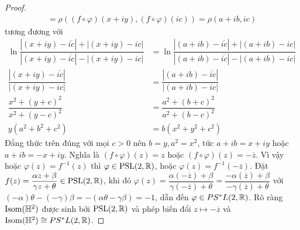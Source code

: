 \begin{proof}
\begin{align*}
        = \rho((f\circ \varphi)(x+iy),(f\circ \varphi)(ic))
        = \rho(a+ib,ic)
    \end{align*}
    tương đương với 
    \begin{align*}
        \ln{\dfrac{|(x+iy)-\overline{ic}|+|(x+iy)-ic|}{|(x+iy)-\overline{ic}|-|(x+iy)-ic|}} &= \ln{\dfrac{|(a+ib)-\overline{ic}|+|(a+ib)-ic|}{|(a+ib)-\overline{ic}|-|(a+ib)-ic|}}\\
        \dfrac{|(x+iy)-\overline{ic}|}{|(x+iy)-ic|} &= \dfrac{|(a+ib)-\overline{ic}|}{|(a+ib)-ic|}\\
        \dfrac{x^2+(y+c)^2}{x^2+(y-c)^2} &= \dfrac{a^2+(b+c)^2}{a^2+(b-c)^2}\\
        y(a^2 + b^2 + c^2) &= b(x^2+y^2+c^2)
    \end{align*}
    Đẳng thức trên đúng với mọi $c>0$ nên $b=y, a^2 = x^2$, tức $a+ib = x+iy$ hoặc $a+ib = -x+iy$. Nghĩa là $(f\circ \varphi)(z) = z$ hoặc $(f\circ \varphi)(z) = -\overline{z}$. Vì vậy hoặc $\varphi(z) = f^{-1}(z)$ thì $\varphi \in \operatorname{PSL}(2,\mathbb{R})$, hoặc $\varphi(z) = f^{-1}(-\overline{z})$. Đặt $f(z) = \dfrac{\alpha z+\beta}{\gamma z+ \theta} \in \operatorname{PSL}(2,\mathbb{R})$, khi đó $\varphi(z) = \dfrac{\alpha (-\overline{z})+\beta}{\gamma (-\overline{z})+ \theta} = \dfrac{-\alpha (\overline{z})+\beta}{-\gamma (\overline{z})+ \theta}$ với $(-\alpha) \theta - (-\gamma)\beta = -(\alpha \theta - \gamma \beta) = -1$, dẫn đến $\varphi \in PS^*L(2,\mathbb{R})$. Rõ ràng $\operatorname{Isom}(\mathbb{H}^2)$ được sinh bởi $\operatorname{PSL}(2,\mathbb{R})$ và phép biến đổi $z\mapsto -\overline{z}$ và $\operatorname{Isom}(\mathbb{H}^2) \cong PS^*L(2,\mathbb{R})$.
\end{proof}
